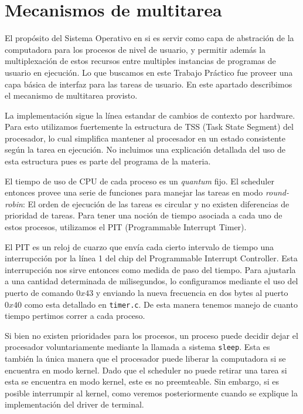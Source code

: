 \section{Mecanismos de multitarea}
\label{sec::multitask}

El prop\'osito del Sistema Operativo en si es servir como capa de abstraci\'on de la
computadora para los procesos de nivel de usuario, y permitir adem\'as la multiplexaci\'on
de estos recursos entre multiples instancias de programas de usuario en ejecuci\'on. Lo que
buscamos en este Trabajo Pr\'actico fue proveer una capa b\'asica de interfaz para las tareas
de usuario. En este apartado describimos el mecanismo de multitarea provisto.

La implementaci\'on sigue la l\'inea estandar de cambios de contexto por hardware. Para esto
utilizamos fuertemente la estructura de TSS (Task State Segment) del procesador, lo cual
simplifica mantener al procesador en un estado consistente seg\'un la tarea en ejecuci\'on.
No incluimos una explicaci\'on detallada del uso de esta estructura pues es parte del programa
de la materia.

El tiempo de uso de CPU de cada proceso es un \textit{quantum} fijo. El scheduler entonces provee
una serie de funciones para manejar las tareas en modo \textit{round-robin}: El orden de ejecuci\'on
de las tareas es circular y no existen diferencias de prioridad de tareas. Para tener una noci\'on
de tiempo asociada a cada uno de estos procesos, utilizamos el PIT (Programmable Interrupt Timer).

El PIT es un reloj de cuarzo que env\'ia cada cierto intervalo de tiempo una interrupcci\'on por la l\'inea
1 del chip del Programmable Interrupt Controller. Esta interrupcci\'on nos sirve entonces como medida de paso
del tiempo. Para ajustarla a una cantidad determinada de milisegundos, lo configuramos mediante el uso del
puerto de comando $0x43$ y enviando la nueva frecuencia en dos bytes al puerto $0x40$ como esta detallado en 
\texttt{timer.c}. De esta manera tenemos manejo de cuanto tiempo pertimos correr a cada proceso.

Si bien no existen prioridades para los procesos, un proceso puede decidir dejar el procesador voluntariamente
mediante la llamada a sistema \texttt{sleep}. Esta es tambi\'en la \'unica manera que el procesador puede liberar
la computadora si se encuentra en modo kernel. Dado que el scheduler no puede retirar una tarea si esta se encuentra
en modo kernel, este es no preemteable. Sin embargo, si es posible interrumpir al kernel, como veremos posteriormente
cuando se explique la implementaci\'on del driver de terminal.

